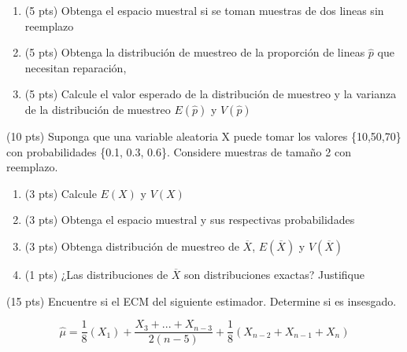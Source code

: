 \documentclass[addpoints]{exam}
\theoremstyle{mytheor}
\begin{document}
\begin{questions}
  \begin{enumerate}
  \item (5 pts) Obtenga el espacio muestral si se toman muestras de dos lineas sin reemplazo
  \item (5 pts) Obtenga la distribución de muestreo de la proporción de lineas $\hat{p}$ que necesitan reparación, 
  \item (5 pts) Calcule el valor esperado de la distribución de muestreo y la varianza de la distribución de muestreo $E(\hat{p})$ y $V(\hat{p})$
  \end{enumerate}
  
  
  \question (10 pts) Suponga que una variable aleatoria X puede tomar los valores \{10,50,70\} con probabilidades \{0.1, 0.3, 0.6\}. Considere muestras de tamaño 2 con reemplazo.
  
  \begin{enumerate}
  \item (3 pts) Calcule $E(X)$ y $V(X)$
  \item (3 pts) Obtenga el espacio muestral y sus respectivas probabilidades
  \item (3 pts) Obtenga distribución de muestreo de $\overline{X}$, $E(\overline{X})$ y $V(\overline{X})$
  \item (1 pts) ¿Las distribuciones de $\overline{X}$ son distribuciones exactas? Justifique
  \end{enumerate}

 \question (15 pts) Encuentre si el ECM del siguiente estimador. Determine si es insesgado. 
   
$$\hat{\mu} = \frac{1}{8} (X_1) + \frac{X_3+...+X_{n-3}}{2(n-5)} + \frac{1}{8} (X_{n-2}+X_{n-1}+X_{n}) $$


\end{questions}
\end{document}
